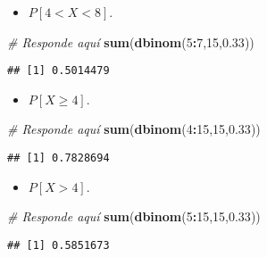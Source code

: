 \documentclass[
]{article}
\newenvironment{Shaded}{\begin{snugshade}}{\end{snugshade}}
\newcommand{\CommentTok}[1]{\textcolor[rgb]{0.56,0.35,0.01}{\textit{#1}}}
\newcommand{\DecValTok}[1]{\textcolor[rgb]{0.00,0.00,0.81}{#1}}
\newcommand{\FloatTok}[1]{\textcolor[rgb]{0.00,0.00,0.81}{#1}}
\newcommand{\KeywordTok}[1]{\textcolor[rgb]{0.13,0.29,0.53}{\textbf{#1}}}
\newcommand{\NormalTok}[1]{#1}
\newcommand{\OperatorTok}[1]{\textcolor[rgb]{0.81,0.36,0.00}{\textbf{#1}}}
\providecommand{\tightlist}{%
  \setlength{\itemsep}{0pt}\setlength{\parskip}{0pt}}
\begin{document}
\begin{itemize}
\tightlist
\item
  \(P[4 < X < 8]\).
\end{itemize}

\begin{Shaded}
\begin{Highlighting}[]
\CommentTok{# Responde aquí}
\KeywordTok{sum}\NormalTok{(}\KeywordTok{dbinom}\NormalTok{(}\DecValTok{5}\OperatorTok{:}\DecValTok{7}\NormalTok{,}\DecValTok{15}\NormalTok{,}\FloatTok{0.33}\NormalTok{))}
\end{Highlighting}
\end{Shaded}

\begin{verbatim}
## [1] 0.5014479
\end{verbatim}

\begin{itemize}
\tightlist
\item
  \(P[X \geq 4]\).
\end{itemize}

\begin{Shaded}
\begin{Highlighting}[]
\CommentTok{# Responde aquí}
\KeywordTok{sum}\NormalTok{(}\KeywordTok{dbinom}\NormalTok{(}\DecValTok{4}\OperatorTok{:}\DecValTok{15}\NormalTok{,}\DecValTok{15}\NormalTok{,}\FloatTok{0.33}\NormalTok{))}
\end{Highlighting}
\end{Shaded}

\begin{verbatim}
## [1] 0.7828694
\end{verbatim}

\begin{itemize}
\tightlist
\item
  \(P[X > 4]\).
\end{itemize}

\begin{Shaded}
\begin{Highlighting}[]
\CommentTok{# Responde aquí}
\KeywordTok{sum}\NormalTok{(}\KeywordTok{dbinom}\NormalTok{(}\DecValTok{5}\OperatorTok{:}\DecValTok{15}\NormalTok{,}\DecValTok{15}\NormalTok{,}\FloatTok{0.33}\NormalTok{))}
\end{Highlighting}
\end{Shaded}

\begin{verbatim}
## [1] 0.5851673
\end{verbatim}
\end{document}
